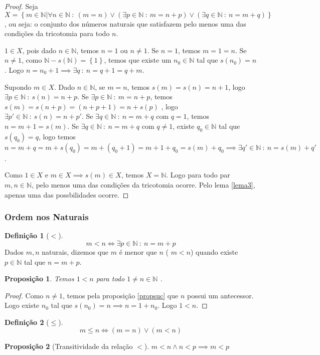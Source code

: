 \documentclass{article}
\newtheorem{prop}{Proposição}[section]
\theoremstyle{theorem}
\theoremstyle{lemma}
\theoremstyle{definition}
\newtheorem{definicao}{Definição}[section]
\theoremstyle{remark}
\begin{document}
\begin{proof}
	Seja $X = \left\{m \in \mathbb{N} | \forall n \in \mathbb{N} \: : \: (m = n ) \lor (	\exists p \in \mathbb{N} \: : \: m = n+p ) \lor ( 	\exists q \in \mathbb{N} \: : \: n = m+q ) \right\}$, ou seja: o conjunto dos números naturais que satisfazem pelo menos uma das condições da tricotomia para todo $n$.  

	$1\in X$, pois dado $n\in \mathbb{N}$, temos $n = 1$ ou $n\neq 1$. Se $n=1$, temos $m =1 = n$. Se $n\neq 1$, como $\mathbb{N} - s(\mathbb{N}) = \left\{1\right\}$, temos que existe um $n_0\in \mathbb{N}$ tal que $s(n_0) = n$. Logo $n = n_0 +1 \implies \exists q \: : \: n = q+1  = q+m $.
	
	Supondo $m\in X$. Dado $n\in \mathbb{N}$, se $m = n$, temos $s(m) = s(n) = n+1$, logo $\exists p \in\mathbb{N} \: : \: s(n) = n+p$. Se  $\exists p \in\mathbb{N} \: : \: m = n+p$, temos $s(m) = s(n+p) = (n+p+1) = n +s(p)$ , logo $\exists p' \in\mathbb{N} \: : \: s(n) = n+p'$. Se $\exists q \in \mathbb{N} \: : \: n = m+q $ com $q=1$, temos $n = m+1 = s(m)$. Se $\exists q \in \mathbb{N} \: : \: n = m+q $ com $q\neq 1$, existe $q_0\in \mathbb{N}$ tal que $s(q_0) = q$, logo temos $n = m+q = m +s(q_0) = m+(q_0+1) = m+1+q_0 = s(m)+q_0 \implies \exists q' \in \mathbb{N} \: : \: n = s(m)+q' $. 

	Como $1\in X$ e $m\in X \implies s(m) \in X$, temos $X = \mathbb{N}$.  Logo para todo par $m,n\in \mathbb{N}$, pelo menos uma das condições da tricotomia ocorre. Pelo lema \ref{lema3}, apenas uma das possbilidades ocorre. 
\end{proof}
\subsubsection{Ordem nos Naturais}
\begin{definicao}[$<$]
	$$ m<n \iff \exists p\in \mathbb{N} \: : \: n = m+p$$
	Dados $m,n$ naturais, dizemos que $m$ é menor que $n$ ( $m<n$) quando existe $p\in \mathbb{N}$ tal que $n = m+p$.
\end{definicao}

\begin{prop}
	Temos $1 < n $ para todo $ 1 \neq n \in \mathbb{N}$ .
\end{prop}
\begin{proof}
	Como $n \neq 1$, temos pela proposição \ref{propsuc} que $n$ possui um antecessor. Logo existe $n_0$ tal que $s(n_0) =n \implies n  = 1+n_0$. Logo $1<n$.
\end{proof}
\begin{definicao}[$\leq$]
	$$m \leq n \iff (m = n) \lor (m <n)$$
\end{definicao}
\begin{prop}[Transitividade da relação $<$]
	$m< n \land n< p \implies m < p$
\end{prop}
\end{document}
